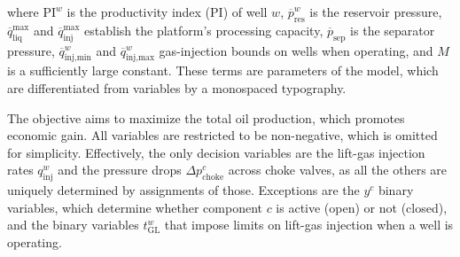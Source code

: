 \documentclass[pdflatex,sn-mathphys-num]{sn-jnl}%
\begin{document}
where $\text{PI}^w$ is the productivity index (PI) of well $w$,  $\overline{p}_{\text{res}}^{w}$ is the reservoir pressure, $\overline{q}_{\text{liq}}^{\text{max}}$ and $\overline{q}_{\text{inj}}^{\text{max}}$ establish the platform's processing capacity, $\overline{p}_{\text{sep}}$ is the separator pressure, $\overline{q}_{\text{inj,min}}^w$ and $\overline{q}_{\text{inj,max}}^w$ gas-injection bounds on wells when operating, and $M$ is a sufficiently large constant.
These terms are parameters of the model, which are differentiated from variables by a monospaced typography.


The objective aims to maximize the total oil production, which promotes economic gain.
All variables are restricted to be non-negative, which is omitted for simplicity.
Effectively, the only decision variables are the lift-gas injection rates $q_{\text{inj}}^{w}$ and the pressure drops $\Delta p_{\text{choke}}^{c}$ across choke valves, as all the others are uniquely determined by assignments of those.
Exceptions are the $y^{c}$ binary variables, which determine whether component $c$ is active (open) or not (closed), and the binary variables $t_{\text{GL}}^w$ that impose limits on lift-gas injection when a well is operating. 
\end{document}
